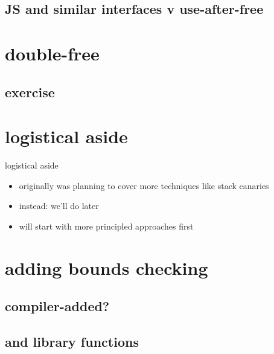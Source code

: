 \subsection{JS and similar interfaces v use-after-free}


\section{double-free}


\subsection{exercise}


\section{logistical aside}
\begin{frame}{logistical aside}
    \begin{itemize}
    \item originally was planning to cover more techniques like stack canaries
    \item instead: we'll do later
    \item will start with more principled approaches first
    \end{itemize}
\end{frame}

\section{adding bounds checking}


\subsection{compiler-added?}


\subsection{and library functions}



